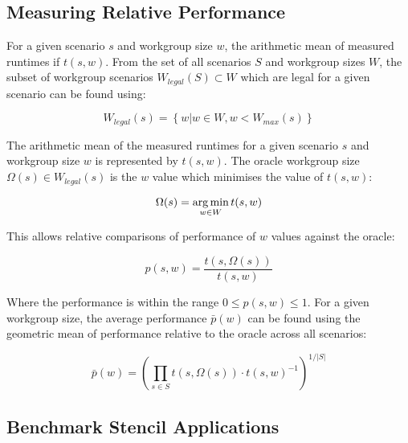 \subsection{Measuring Relative Performance}


For a given scenario $s$ and workgroup size $w$, the arithmetic mean
of measured runtimes if $t(s,w)$. From the set of all scenarios $S$
and workgroup sizes $W$, the subset of workgroup scenarios
$W_{legal}(S) \subset W$ which are legal for a given scenario can be
found using:

\begin{equation}
W_{legal}(s) = \left\{w | w \in W, w < W_{max}(s) \right\}
\end{equation}

The arithmetic mean of the measured runtimes for a given scenario $s$
and workgroup size $w$ is represented by $t(s,w)$. The oracle
workgroup size $\Omega(s) \in W_{legal}(s)$ is the $w$ value which
minimises the value of $t(s,w)$:

\begin{equation}
\Omega(s) = \operatorname*{arg\,min}_{w \in W} t(s,w)
\end{equation}

This allows relative comparisons of performance of $w$ values against
the oracle:

\begin{equation}
p(s,w) = \frac{t(s,\Omega(s))}{t(s,w)}
\end{equation}

Where the performance is within the range $0 \le p(s,w) \le 1$. For a
given workgroup size, the average performance $\bar{p}(w)$ can be
found using the geometric mean of performance relative to the oracle
across all scenarios:

\begin{equation}
\bar{p}(w) =
\left(
  \prod_{s \in S} t(s,\Omega(s)) \cdot t(s,w)^{-1}
\right)^{1/|S|}
\end{equation}


\subsection{Benchmark Stencil Applications}

